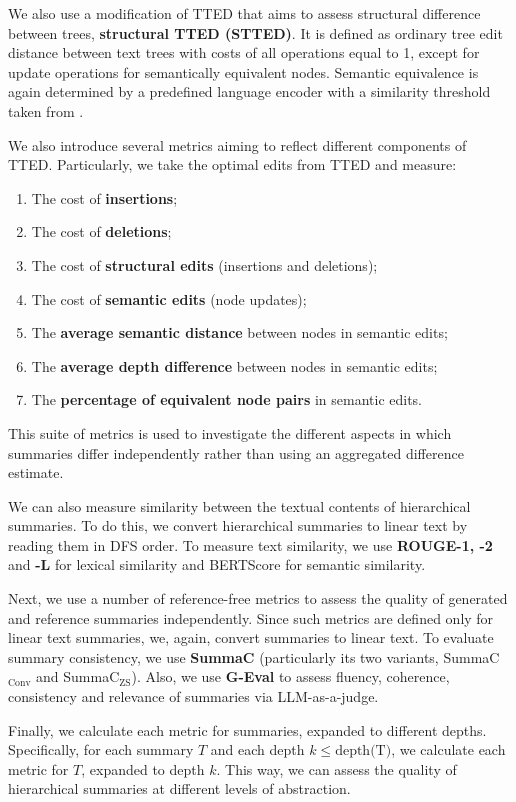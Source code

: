 \documentclass[11pt,a4paper]{article}
\begin{document}
We also use a modification of TTED that aims to assess structural difference between trees, \textbf{structural TTED (STTED)}. It is defined as ordinary tree edit distance between text trees with costs of all operations equal to 1, except for update operations for semantically equivalent nodes. Semantic equivalence is again determined by a predefined language encoder with a similarity threshold taken from \cite{vrbanec2023comparison}.

We also introduce several metrics aiming to reflect different components of TTED. Particularly, we take the optimal edits from TTED and measure:
\begin{enumerate}
    \item The cost of \textbf{insertions};
    \item The cost of \textbf{deletions};
    \item The cost of \textbf{structural edits} (insertions and deletions);
    \item The cost of \textbf{semantic edits} (node updates);
    \item The \textbf{average semantic distance} between nodes in semantic edits;
    \item The \textbf{average depth difference} between nodes in semantic edits;
    \item The \textbf{percentage of equivalent node pairs} in semantic edits.
\end{enumerate}
This suite of metrics is used to investigate the different aspects in which summaries differ independently rather than using an aggregated difference estimate.

We can also measure similarity between the textual contents of hierarchical summaries. To do this, we convert hierarchical summaries to linear text by reading them in DFS order. To measure text similarity, we use \textbf{ROUGE-1, -2} and \textbf{-L} for lexical similarity and BERTScore for semantic similarity.

Next, we use a number of reference-free metrics to assess the quality of generated and reference summaries independently. Since such metrics are defined only for linear text summaries, we, again, convert summaries to linear text. To evaluate summary consistency, we use \textbf{SummaC} \cite{laban2022summac} (particularly its two variants, SummaC$_\text{Conv}$ and SummaC$_\text{ZS}$). Also, we use \textbf{G-Eval} \cite{liu2023g} to assess fluency, coherence, consistency and relevance of summaries via LLM-as-a-judge.

Finally, we calculate each metric for summaries, expanded to different depths. Specifically, for each summary $T$ and each depth $k\leq\text{depth(T)}$, we calculate each metric for $T$, expanded to depth $k$. This way, we can assess the quality of hierarchical summaries at different levels of abstraction. 
\end{document}
